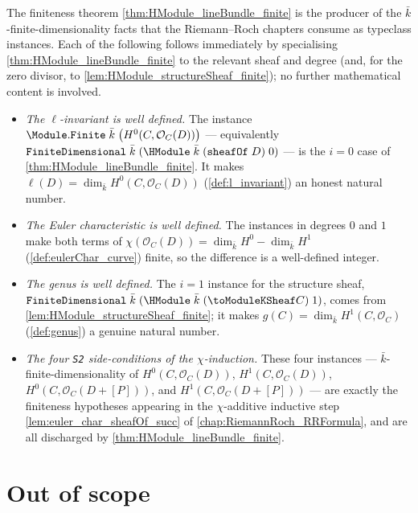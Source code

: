 The finiteness theorem \cref{thm:HModule_lineBundle_finite} is the
producer of the \(\bar k\)-finite-dimensionality facts that the
Riemann--Roch chapters consume as typeclass instances. Each of the
following follows immediately by specialising
\cref{thm:HModule_lineBundle_finite} to the relevant sheaf and degree
(and, for the zero divisor, to \cref{lem:HModule_structureSheaf_finite});
no further mathematical content is involved.

\begin{itemize}
  \item \emph{The \(\ell\)-invariant is well defined.} The instance
    \(\Module.\mathtt{Finite}\;\bar k\;\bigl(H^0(C, \mathcal O_C(D))\bigr)\)
    --- equivalently
    \(\mathtt{FiniteDimensional}\;\bar k\;(\HModule\;\bar k\;
    (\mathtt{sheafOf}\;D)\;0)\) --- is the \(i = 0\) case of
    \cref{thm:HModule_lineBundle_finite}. It makes
    \(\ell(D) = \dim_{\bar k} H^0(C, \mathcal O_C(D))\)
    (\cref{def:l_invariant}) an honest natural number.
  \item \emph{The Euler characteristic is well defined.} The instances
    in degrees \(0\) and \(1\) make both terms of
    \(\chi(\mathcal O_C(D)) = \dim_{\bar k} H^0 - \dim_{\bar k} H^1\)
    (\cref{def:eulerChar_curve}) finite, so the difference is a
    well-defined integer.
  \item \emph{The genus is well defined.} The \(i = 1\) instance for the
    structure sheaf, \(\mathtt{FiniteDimensional}\;\bar k\;
    (\HModule\;\bar k\;(\toModuleKSheaf C)\;1)\), comes from
    \cref{lem:HModule_structureSheaf_finite}; it makes
    \(g(C) = \dim_{\bar k} H^1(C, \mathcal O_C)\) (\cref{def:genus}) a
    genuine natural number.
  \item \emph{The four \texttt{S2} side-conditions of the
    \(\chi\)-induction.} These four instances ---
    \(\bar k\)-finite-dimensionality of
    \(H^0(C, \mathcal O_C(D))\), \(H^1(C, \mathcal O_C(D))\),
    \(H^0(C, \mathcal O_C(D + [P]))\), and
    \(H^1(C, \mathcal O_C(D + [P]))\) --- are exactly the finiteness
    hypotheses appearing in the \(\chi\)-additive inductive step
    \cref{lem:euler_char_sheafOf_succ} of
    \cref{chap:RiemannRoch_RRFormula}, and are all discharged by
    \cref{thm:HModule_lineBundle_finite}.
\end{itemize}

\section{Out of scope}

